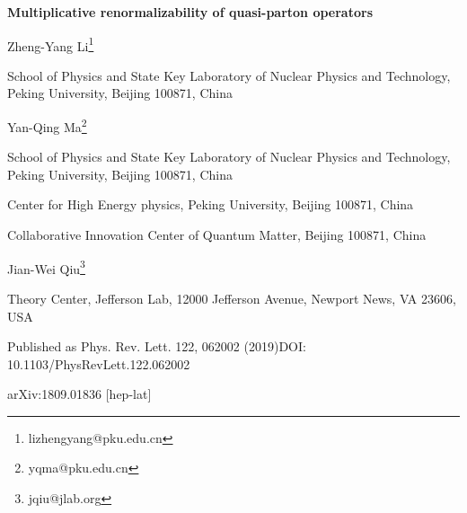 \documentclass[11pt]{article}
\begin{document}
\begin{center}
  {\LARGE\bfseries Multiplicative renormalizability of quasi-parton operators\par}
  \vspace{1.2em}
  {\large Zheng-Yang Li\footnote{lizhengyang@pku.edu.cn}\par}
  \vspace{0.2em}
  {\normalsize School of Physics and State Key Laboratory of Nuclear Physics and Technology, Peking University, Beijing 100871, China\par}
  \vspace{0.8em}
  {\large Yan-Qing Ma\footnote{yqma@pku.edu.cn}\par}
  \vspace{0.2em}
  {\normalsize School of Physics and State Key Laboratory of Nuclear Physics and Technology, Peking University, Beijing 100871, China\par}
  {\normalsize Center for High Energy physics, Peking University, Beijing 100871, China\par}
  {\normalsize Collaborative Innovation Center of Quantum Matter, Beijing 100871, China\par}
  \vspace{0.8em}
  {\large Jian-Wei Qiu\footnote{jqiu@jlab.org}\par}
  \vspace{0.2em}
  {\normalsize Theory Center, Jefferson Lab, 12000 Jefferson Avenue, Newport News, VA 23606, USA\par}
  \vspace{1.2em}
  {\small Published as Phys. Rev. Lett. 122, 062002 (2019)\quad DOI: 10.1103/PhysRevLett.122.062002\par}
  {\small arXiv:1809.01836 [hep-lat]\par}
\end{center}

\vspace{1em}









\end{document}
